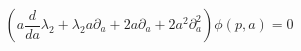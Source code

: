 \begin{equation}
(a \frac {d} {da} \lambda_2+ \lambda_2 a\partial_a+ 2
a\partial_a+2 a^2\partial_a^2)\phi(p,a)=0
\end{equation}

